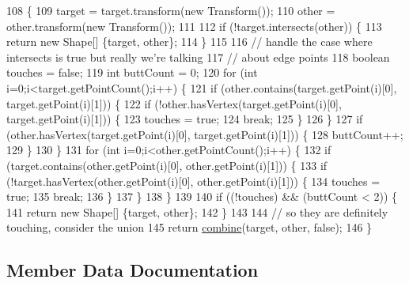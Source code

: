 \begin{DoxyCode}
108                                                     \{
109         target = target.transform(\textcolor{keyword}{new} Transform());
110         other = other.transform(\textcolor{keyword}{new} Transform());
111         
112         \textcolor{keywordflow}{if} (!target.intersects(other)) \{
113             \textcolor{keywordflow}{return} \textcolor{keyword}{new} Shape[] \{target, other\};
114         \}
115         
116         \textcolor{comment}{// handle the case where intersects is true but really we're talking}
117         \textcolor{comment}{// about edge points}
118         \textcolor{keywordtype}{boolean} touches = \textcolor{keyword}{false};
119         \textcolor{keywordtype}{int} buttCount = 0;
120         \textcolor{keywordflow}{for} (\textcolor{keywordtype}{int} i=0;i<target.getPointCount();i++) \{
121             \textcolor{keywordflow}{if} (other.contains(target.getPoint(i)[0], target.getPoint(i)[1])) \{
122                 \textcolor{keywordflow}{if} (!other.hasVertex(target.getPoint(i)[0], target.getPoint(i)[1])) \{
123                     touches = \textcolor{keyword}{true};
124                     \textcolor{keywordflow}{break};
125                 \}
126             \}
127             \textcolor{keywordflow}{if} (other.hasVertex(target.getPoint(i)[0], target.getPoint(i)[1])) \{
128                 buttCount++;
129             \} 
130         \}
131         \textcolor{keywordflow}{for} (\textcolor{keywordtype}{int} i=0;i<other.getPointCount();i++) \{
132             \textcolor{keywordflow}{if} (target.contains(other.getPoint(i)[0], other.getPoint(i)[1])) \{
133                 \textcolor{keywordflow}{if} (!target.hasVertex(other.getPoint(i)[0], other.getPoint(i)[1])) \{
134                     touches = \textcolor{keyword}{true};
135                     \textcolor{keywordflow}{break};
136                 \}
137             \}
138         \}
139         
140         \textcolor{keywordflow}{if} ((!touches) && (buttCount < 2)) \{
141             \textcolor{keywordflow}{return} \textcolor{keyword}{new} Shape[] \{target, other\};
142         \}
143         
144         \textcolor{comment}{// so they are definitely touching, consider the union}
145         \textcolor{keywordflow}{return} \mbox{\hyperlink{classorg_1_1newdawn_1_1slick_1_1geom_1_1_geom_util_a3f61c5128808d5737d963c353910d3e5}{combine}}(target, other, \textcolor{keyword}{false});
146     \}
\end{DoxyCode}


\subsection{Member Data Documentation}
\mbox{\label{classorg_1_1newdawn_1_1slick_1_1geom_1_1_geom_util_a249ee70d4c9395cdad063bb34a796864}} 
